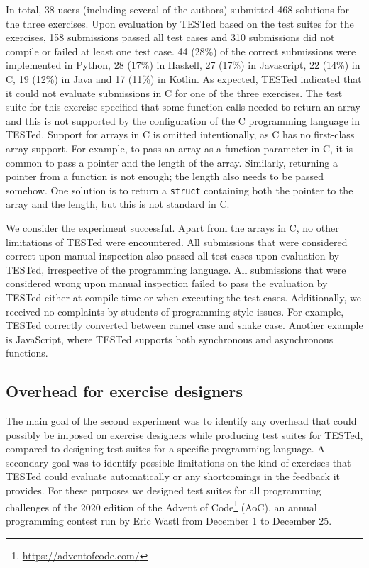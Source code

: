 \documentclass[../main]{subfiles}
\begin{document}
In total, 38 users (including several of the authors) submitted 468 solutions for the three exercises.
Upon evaluation by TESTed based on the test suites for the exercises, 158 submissions passed all test cases and 310 submissions did not compile or failed at least one test case.
44 (28\%) of the correct submissions were implemented in Python, 28 (17\%) in Haskell, 27 (17\%) in Javascript, 22 (14\%) in C, 19 (12\%) in Java and 17 (11\%) in Kotlin.
As expected, TESTed indicated that it could not evaluate submissions in C for one of the three exercises.
The test suite for this exercise specified that some function calls needed to return an array and this is not supported by the configuration of the C programming language in TESTed.
Support for arrays in C is omitted intentionally, as C has no first-class array support.
For example, to pass an array as a function parameter in C, it is common to pass a pointer and the length of the array.
Similarly, returning a pointer from a function is not enough;
the length also needs to be passed somehow.
One solution is to return a \texttt{struct} containing both the pointer to the array and the length, but this is not standard in C\@.

We consider the experiment successful.
Apart from the arrays in C, no other limitations of TESTed were encountered.
All submissions that were considered correct upon manual inspection also passed all test cases upon evaluation by TESTed, irrespective of the programming language.
All submissions that were considered wrong upon manual inspection failed to pass the evaluation by TESTed either at compile time or when executing the test cases.
Additionally, we received no complaints by students of programming style issues.
For example, TESTed correctly converted between camel case and snake case.
Another example is JavaScript, where TESTed supports both synchronous and asynchronous functions.

\subsection{Overhead for exercise designers}\label{subsec:overhead-for-exercise-designers}

The main goal of the second experiment was to identify any overhead that could possibly be imposed on exercise designers while producing test suites for TESTed, compared to designing test suites for a specific programming language.
A secondary goal was to identify possible limitations on the kind of exercises that TESTed could evaluate automatically or any shortcomings in the feedback it provides.
For these purposes we designed test suites for all programming challenges of the 2020 edition of the Advent of Code\footnote{\url{https://adventofcode.com/}} (AoC), an annual programming contest run by Eric Wastl from December 1 to December 25.
\end{document}
